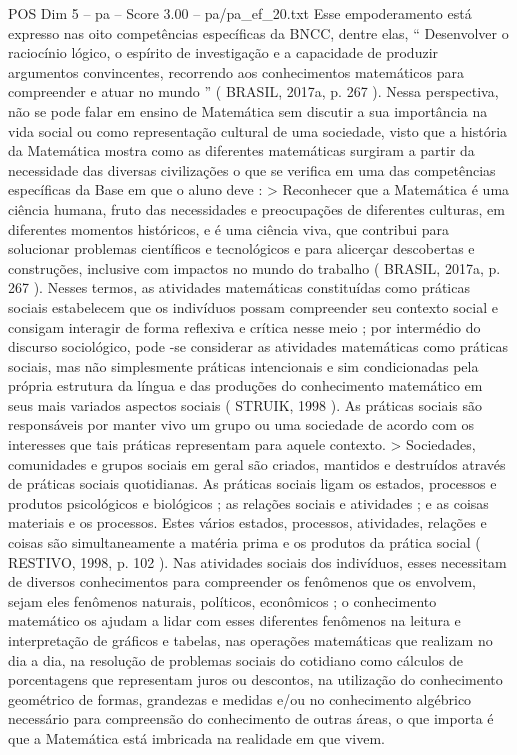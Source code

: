 \begin{textsample}{POS Dim 5 – pa – Score 3.00 – pa/pa\_ef\_20.txt}
Esse empoderamento está expresso nas oito competências específicas da BNCC, dentre elas, “ Desenvolver o raciocínio lógico, o espírito de investigação e a capacidade de produzir argumentos convincentes, recorrendo aos conhecimentos matemáticos para compreender e atuar no mundo ” ( BRASIL, 2017a, p. 267 ).
Nessa perspectiva, não se pode falar em ensino de Matemática sem discutir a sua importância na vida social ou como representação cultural de uma sociedade, visto que a história da Matemática mostra como as diferentes matemáticas surgiram a partir da necessidade das diversas civilizações o que se verifica em uma das competências específicas da Base em que o aluno deve : > Reconhecer que a Matemática é uma ciência humana, fruto das necessidades e preocupações de diferentes culturas, em diferentes momentos históricos, e é uma ciência viva, que contribui para solucionar problemas científicos e tecnológicos e para alicerçar descobertas e construções, inclusive com impactos no mundo do trabalho ( BRASIL, 2017a, p. 267 ).
Nesses termos, as atividades matemáticas constituídas como práticas sociais estabelecem que os indivíduos possam compreender seu contexto social e consigam interagir de forma reflexiva e crítica nesse meio ; por intermédio do discurso sociológico, pode -se considerar as atividades matemáticas como práticas sociais, mas não simplesmente práticas intencionais e sim condicionadas pela própria estrutura da língua e das produções do conhecimento matemático em seus mais variados aspectos sociais ( STRUIK, 1998 ).
As práticas sociais são responsáveis por manter vivo um grupo ou uma sociedade de acordo com os interesses que tais práticas representam para aquele contexto. > Sociedades, comunidades e grupos sociais em geral são criados, mantidos e destruídos através de práticas sociais quotidianas.
As práticas sociais ligam os estados, processos e produtos psicológicos e biológicos ; as relações sociais e atividades ; e as coisas materiais e os processos.
Estes vários estados, processos, atividades, relações e coisas são simultaneamente a matéria prima e os produtos da prática social ( RESTIVO, 1998, p. 102 ).
Nas atividades sociais dos indivíduos, esses necessitam de diversos conhecimentos para compreender os fenômenos que os envolvem, sejam eles fenômenos naturais, políticos, econômicos ; o conhecimento matemático os ajudam a lidar com esses diferentes fenômenos na leitura e interpretação de gráficos e tabelas, nas operações matemáticas que realizam no dia a dia, na resolução de problemas sociais do cotidiano como cálculos de porcentagens que representam juros ou descontos, na utilização do conhecimento geométrico de formas, grandezas e medidas e/ou no conhecimento algébrico necessário para compreensão do conhecimento de outras áreas, o que importa é que a Matemática está imbricada na realidade em que vivem.

\end{textsample}
